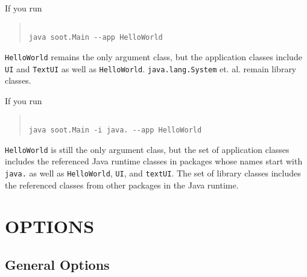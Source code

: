 \documentclass{article}
\begin{document}
\par

If you run 

\begin{quote}\begin{verbatim}

java soot.Main --app HelloWorld

\end{verbatim}\end{quote}

{\tt HelloWorld} remains the
only argument class, but the application classes include {\tt UI}
and {\tt TextUI} as well as {\tt HelloWorld}.
{\tt java.lang.System} et. al. remain library classes.


\par

If you run 

\begin{quote}\begin{verbatim}

java soot.Main -i java. --app HelloWorld

\end{verbatim}\end{quote}

{\tt HelloWorld} is still the only argument class, but the set
of application classes includes the referenced Java runtime
classes in packages whose names start with {\tt java.} as well
as {\tt HelloWorld}, {\tt UI}, and {\tt textUI}. The set
of library classes includes the referenced classes from other
packages in the Java runtime.


\section{OPTIONS}


\subsection{General Options}
\end{document}
